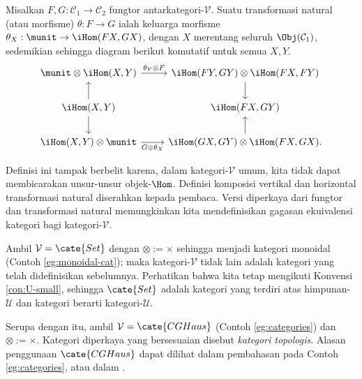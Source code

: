 \begin{definition}\label{def:enriched-naturaltrans}
	Misalkan $F, G: \mathcal{C}_1 \to \mathcal{C}_2$ fungtor antarkategori-$\mathcal{V}$. Suatu transformasi natural (atau morfisme) $\theta: F \to G$ ialah keluarga morfisme $\theta_X: \munit \to \iHom(FX, GX)$, dengan $X$ merentang seluruh $\Obj(\mathcal{C}_1)$, sedemikian sehingga diagram berikut komutatif untuk semua $X, Y$.
	\[ \begin{tikzcd}
		\munit \otimes \iHom(X, Y) \arrow[r, "{\theta_Y \otimes F}"] & \iHom(FY, GY) \otimes \iHom(FX, FY) \arrow[d] \\
		\iHom(X, Y) \arrow[u] \arrow[d] & \iHom(FX, GY) \\
		\iHom(X, Y) \otimes \munit \arrow[r, "{G \otimes \theta_X}"'] & \iHom(GX, GY) \otimes \iHom(FX, GX) \arrow[u] .
	\end{tikzcd} \]
\end{definition}
Definisi ini tampak berbelit karena, dalam kategori-$\mathcal{V}$ umum, kita tidak dapat membicarakan unsur-unsur objek-$\Hom$. Definisi komposisi vertikal dan horizontal transformasi natural diserahkan kepada pembaca. Versi diperkaya dari fungtor dan transformasi natural memungkinkan kita mendefinisikan gagasan ekuivalensi kategori bagi kategori-$\mathcal{V}$.

\begin{example}
	Ambil $\mathcal{V} = \cate{Set}$ dengan $\otimes := \times$ sehingga menjadi kategori monoidal (Contoh \ref{eg:monoidal-cat}); maka kategori-$\mathcal{V}$ tidak lain adalah kategori yang telah didefinisikan sebelumnya. Perhatikan bahwa kita tetap mengikuti Konvensi \ref{con:U-small}, sehingga $\cate{Set}$ adalah kategori yang terdiri atas himpunan-$\mathcal{U}$ dan kategori berarti kategori-$\mathcal{U}$.
\end{example}

\begin{example}
	Serupa dengan itu, ambil $\mathcal{V} = \cate{CGHaus}$ (Contoh \ref{eg:categories}) dan $\otimes := \times$. Kategori diperkaya yang bersesuaian disebut \emph{kategori topologis}. Alasan penggunaan $\cate{CGHaus}$ dapat dilihat dalam pembahasan pada Contoh \ref{eg:categories}, atau dalam \cite[Chapter 5]{May99}. 
\end{example}

